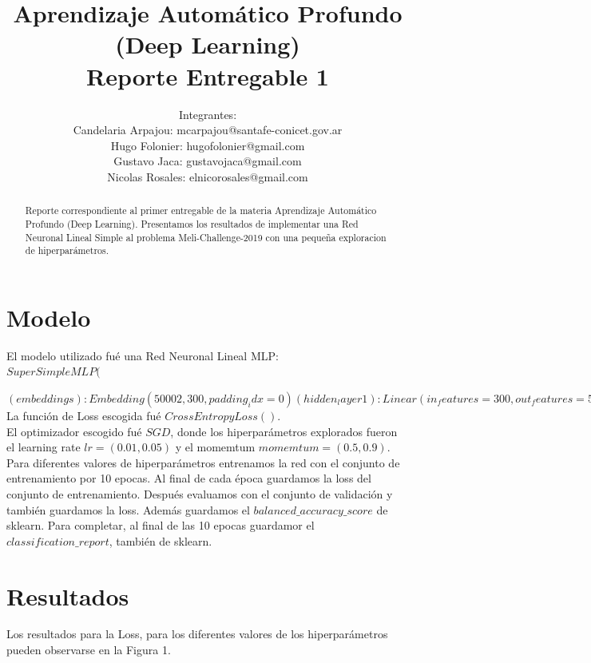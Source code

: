 \documentclass[a4paper,10pt]{article}
\title{\bf{Aprendizaje Automático Profundo\\ 
(Deep Learning)\\
Reporte Entregable 1}}
\author{Integrantes:\\
Candelaria Arpajou: mcarpajou@santafe-conicet.gov.ar\\
Hugo Folonier: hugofolonier@gmail.com\\
Gustavo Jaca: gustavojaca@gmail.com\\
Nicolas Rosales: elnicorosales@gmail.com}
\begin{document}
\maketitle

\begin{abstract}
Reporte correspondiente al primer entregable de la materia Aprendizaje Automático Profundo (Deep Learning). Presentamos los resultados de implementar una Red Neuronal Lineal Simple al problema Meli-Challenge-2019 con una pequeña exploracion de hiperparámetros. 
\end{abstract}

\section*{Modelo}

El modelo utilizado fué una Red Neuronal Lineal MLP:\\

$SuperSimpleMLP($

$  (embeddings): Embedding(50002, 300, padding_idx=0)
  (hidden_layer1): Linear(in_features=300, out_features=512, bias=True)
  (hidden_layer2): Linear(in_features=512, out_features=8192, bias=True)
  (hidden_layer3): Linear(in_features=8192, out_features=1024, bias=True)
  (output_layer): Linear(in_features=1024, out_features=632, bias=True)
)$\\

La función de Loss escogida fué $CrossEntropyLoss()$.\\

El optimizador escogido fué $SGD$, donde los hiperparámetros explorados fueron el learning rate $lr = (0.01, 0.05)$ y el momemtum $momemtum = (0.5, 0.9)$.\\

Para diferentes valores de hiperparámetros entrenamos la red con el conjunto de entrenamiento por 10 epocas. Al final de cada época guardamos la loss del conjunto de entrenamiento. Después evaluamos con el conjunto de validación y también guardamos la loss. Además guardamos el $balanced\_accuracy\_score$ de sklearn. Para completar, al final de las 10 epocas guardamor el $classification\_report$, también de sklearn.

\section*{Resultados}

Los resultados para la Loss, para los diferentes valores de los hiperparámetros pueden observarse en la Figura 1.
\end{document}

